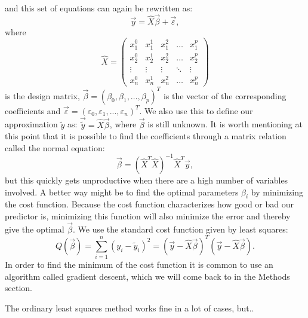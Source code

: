\documentclass[a4paper,12pt]{article}
\begin{document}
and this set of equations can again be rewritten as:
\begin{equation}
\vec{y}=\hat{X}\vec{\beta}+\vec{\varepsilon},
\label{eq:y_xb}
\end{equation}
where
\begin{equation}
\hat{X}=\begin{pmatrix}
x_1^0&x_1^1&x_1^2&\hdots&x_1^p\\
x_2^0&x_2^1&x_2^2&\hdots&x_2^p\\
\vdots&\vdots&\vdots&\ddots&\vdots\\
x_n^0&x_n^1&x_n^2&\hdots&x_n^p
\end{pmatrix}
\end{equation}
is the design matrix, $\vec{\beta}=(\beta_0, \beta_1, \hdots, \beta_p)^T$ is the vector of the corresponding coefficients and $\vec{\varepsilon} = (\varepsilon_0, \varepsilon_1,..., \varepsilon_n)^T$.\newline
We also use this to define our approximation $\tilde{y}$ as: $\vec{\tilde{y}} = \hat{X}\vec{\beta}$, where $\vec{\beta}$ is still unknown.\newline
It is worth mentioning at this point that it is possible to find the coefficients through a matrix relation called the normal equation:
\begin{equation}
\vec{\beta}=(\hat{X}^T\hat{X})^{-1}\hat{X}^T\vec{y},
\end{equation}
but this quickly gets unproductive when there are a high number of variables involved. A better way might be to find the optimal parameters $\beta_i$ by minimizing the cost function. Because the cost function characterizes how good or bad our predictor is, minimizing this function will also minimize the error and thereby give the optimal $\vec{\beta}$.
We use the standard cost function given by least squares:
\begin{equation}
Q(\vec{\beta})=\sum_{i=1}^{n}(y_i-\tilde{y}_i)^2=(\vec{y}-\hat{X}\vec{\beta})^T(\vec{y}-\hat{X}\vec{\beta}).
\end{equation}
In order to find the minimum of the cost function it is common to use an algorithm called gradient descent, which we will come back to in the Methods section.\newline

The ordinary least squares method works fine in a lot of cases, but..
\end{document}
